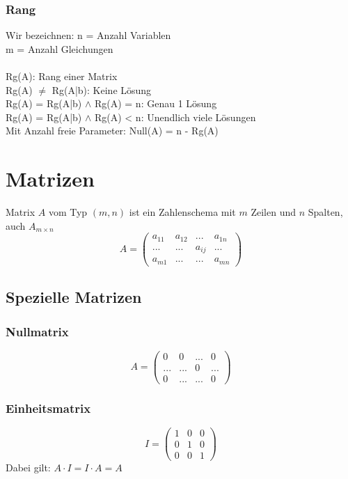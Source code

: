 \documentclass{report}
\begin{document}
\subsection{Rang}
Wir bezeichnen: n = Anzahl Variablen\\
m = Anzahl Gleichungen\\\\
Rg(A): Rang einer Matrix\\
Rg(A) $\neq$ Rg(A|b): Keine Lösung\\
Rg(A) = Rg(A|b) $\land$ Rg(A) = n: Genau 1 Lösung\\
Rg(A) = Rg(A|b) $\land$ Rg(A) < n: Unendlich viele Lösungen\\
Mit Anzahl freie Parameter: Null(A) = n - Rg(A)
\chapter{Matrizen}
Matrix $A$ vom Typ $(m,n)$ ist ein Zahlenschema mit $m$ Zeilen und $n$ Spalten, auch $A_{m \times n}$
\begin{equation}A = \left(\begin{matrix}a_{11} & a_{12} & ... & a_{1n}\\... & ... & a_{ij} & ...\\a_{m1} & ... & ... & a_{mn}\end{matrix}\right)\end{equation}
\section{Spezielle Matrizen}
\subsection{Nullmatrix}
\begin{equation}A = \left(\begin{matrix}0 & 0 & ... & 0\\... & ... & 0 & ...\\0 & ... & ... & 0\end{matrix}\right)\end{equation}
\subsection{Einheitsmatrix}
\begin{equation}I = \left(\begin{matrix}1 & 0 & 0\\0 & 1 & 0\\0 & 0 & 1\end{matrix}\right)\end{equation}
Dabei gilt: $A \cdot I = I \cdot A = A$
\end{document}

